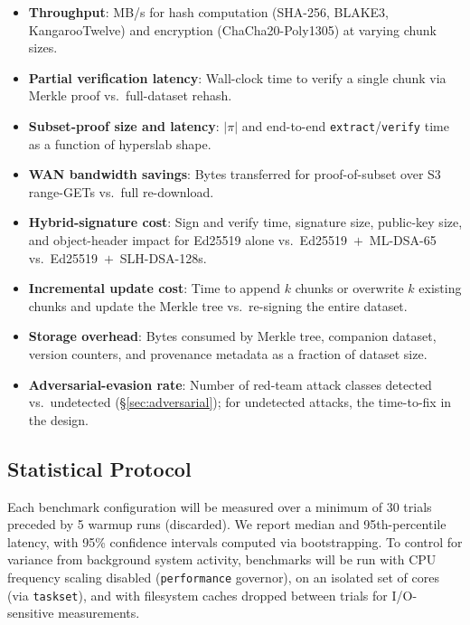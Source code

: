 \documentclass[11pt]{article}
\begin{document}
\begin{itemize}[nosep]
  \item \textbf{Throughput}: MB/s for hash computation
    (SHA-256, BLAKE3, KangarooTwelve) and encryption (ChaCha20-Poly1305)
    at varying chunk sizes.
  \item \textbf{Partial verification latency}: Wall-clock time to verify a
    single chunk via Merkle proof vs.\ full-dataset rehash.
  \item \textbf{Subset-proof size and latency}: $|\pi|$ and end-to-end
    \texttt{extract}/\texttt{verify} time as a function of hyperslab shape.
  \item \textbf{WAN bandwidth savings}: Bytes transferred for proof-of-subset
    over S3 range-GETs vs.\ full re-download.
  \item \textbf{Hybrid-signature cost}: Sign and verify time, signature size,
    public-key size, and object-header impact for Ed25519 alone vs.\
    Ed25519~$+$~ML-DSA-65 vs.\ Ed25519~$+$~SLH-DSA-128s.
  \item \textbf{Incremental update cost}: Time to append $k$ chunks or
    overwrite $k$ existing chunks and update the Merkle tree vs.\ re-signing
    the entire dataset.
  \item \textbf{Storage overhead}: Bytes consumed by Merkle tree, companion
    dataset, version counters, and provenance metadata as a fraction of
    dataset size.
  \item \textbf{Adversarial-evasion rate}: Number of red-team attack classes
    detected vs.\ undetected (\S\ref{sec:adversarial}); for undetected
    attacks, the time-to-fix in the design.
\end{itemize}

\subsection{Statistical Protocol}

Each benchmark configuration will be measured over a minimum of 30 trials
preceded by 5 warmup runs (discarded). We report median and 95th-percentile
latency, with 95\% confidence intervals computed via bootstrapping. To control
for variance from background system activity, benchmarks will be run with CPU
frequency scaling disabled (\texttt{performance} governor), on an isolated set
of cores (via \texttt{taskset}), and with filesystem caches dropped between
trials for I/O-sensitive measurements.


\end{document}
